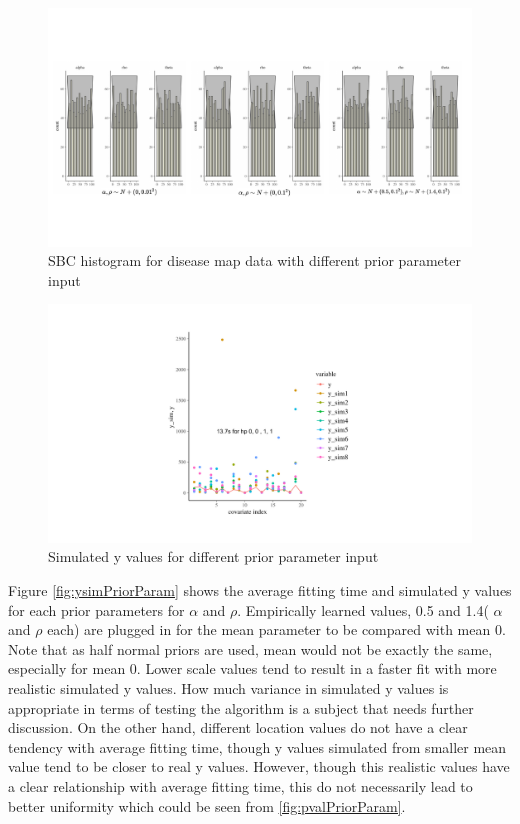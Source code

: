 \documentclass{article}
\begin{document}
  \begin{figure}[!htb]
  \centering
    \includegraphics[width=\textwidth]{figures/diseasemap_sbc.pdf}
    \caption{SBC histogram for disease map data with different prior parameter input}
    \label{fig:dmSBC}
  \end{figure}
  
  \begin{figure}[!htb]
  \centering
    \includegraphics[width=\textwidth]{figures/y_sim_extreme.pdf}
    \caption{Simulated y values for different prior parameter input}
    \label{fig:ysimExtreme}
  \end{figure}
  
 Figure \ref{fig:ysimPriorParam} shows the average fitting time and simulated y values for each prior parameters for $\alpha$ and $\rho$. Empirically learned values, 0.5 and 1.4( $\alpha$ and $\rho$ each) are plugged in for the mean parameter to be compared with mean 0. Note that as half normal priors are used, mean would not be exactly the same, especially for mean 0. Lower scale values tend to result in a faster fit with more realistic simulated y values. How much variance in simulated y values is appropriate in terms of testing the algorithm is a subject that needs further discussion. On the other hand, different location values do not have a clear tendency with average fitting time, though y values simulated from smaller mean value tend to be closer to real y values. However, though this realistic values have a clear relationship with average fitting time, this do not necessarily lead to better uniformity which could be seen from \ref{fig:pvalPriorParam}.
 
\end{document}
